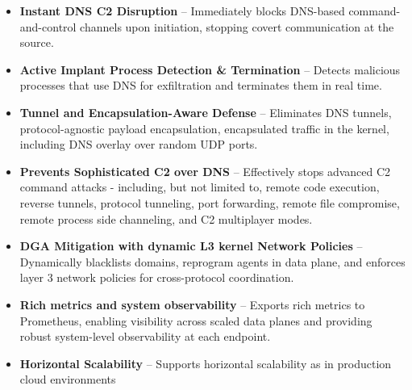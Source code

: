 \documentclass [11pt, proquest] {uwthesis}[2020/02/24]
\begin{document}

\begin{itemize}[nosep]
    \item \textbf{Instant DNS C2 Disruption} – Immediately blocks DNS-based command-and-control channels upon initiation, stopping covert communication at the source.

    \item \textbf{Active Implant Process Detection \& Termination} – Detects malicious processes that use DNS for exfiltration and terminates them in real time.

    \item \textbf{Tunnel and Encapsulation-Aware Defense} – Eliminates DNS tunnels, protocol-agnostic payload encapsulation, encapsulated traffic in the kernel, including DNS overlay over random UDP ports.

    \item \textbf{Prevents Sophisticated C2 over DNS} – Effectively stops advanced C2 command attacks - including, but not limited to, remote code execution, reverse tunnels, protocol tunneling, port forwarding, remote file compromise, remote process side channeling, and C2 multiplayer modes.

    \item \textbf{DGA Mitigation with dynamic L3 kernel Network Policies} – Dynamically blacklists  domains, reprogram agents in data plane, and enforces layer 3 network policies for cross-protocol coordination.

    \item \textbf{Rich metrics and system observability} – Exports rich metrics to Prometheus, enabling visibility across scaled data planes and providing robust system-level observability at each endpoint.

    \item \textbf{Horizontal Scalability} – Supports horizontal scalability as in production cloud environments 

\end{itemize}
\end{document}
